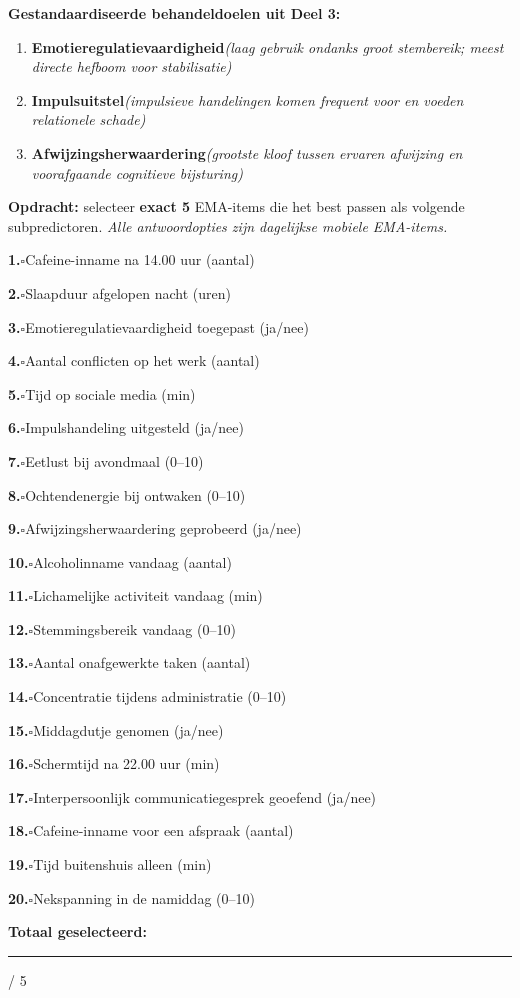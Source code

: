 \documentclass[11pt,a4paper]{article}
\newcommand{\checkitemBFS}[2]{%
\noindent\small\textbf{#1.}\hspace{0.45em}$\square$\hspace{0.4em}#2\par\vspace{0.20em}}
\begin{document}
\begin{contextbox}
\small\textbf{Gestandaardiseerde behandeldoelen uit Deel 3:}
\begin{enumerate}[topsep=2pt,itemsep=1pt,label=\arabic*.]
\item \textbf{Emotieregulatievaardigheid}\quad\textit{\small (laag gebruik ondanks groot stembereik; meest directe hefboom voor stabilisatie)}
\item \textbf{Impulsuitstel}\quad\textit{\small (impulsieve handelingen komen frequent voor en voeden relationele schade)}
\item \textbf{Afwijzingsherwaardering}\quad\textit{\small (grootste kloof tussen ervaren afwijzing en voorafgaande cognitieve bijsturing)}
\end{enumerate}
\end{contextbox}

\begin{responsebox}
\small\textbf{Opdracht:} selecteer \textbf{exact 5} EMA-items die het best passen als volgende subpredictoren.
\textit{Alle antwoordopties zijn dagelijkse mobiele EMA-items.}

\checkitemBFS{1}{Cafeine-inname na 14.00 uur (aantal)}
\checkitemBFS{2}{Slaapduur afgelopen nacht (uren)}
\checkitemBFS{3}{Emotieregulatievaardigheid toegepast (ja/nee)}
\checkitemBFS{4}{Aantal conflicten op het werk (aantal)}
\checkitemBFS{5}{Tijd op sociale media (min)}
\checkitemBFS{6}{Impulshandeling uitgesteld (ja/nee)}
\checkitemBFS{7}{Eetlust bij avondmaal (0--10)}
\checkitemBFS{8}{Ochtendenergie bij ontwaken (0--10)}
\checkitemBFS{9}{Afwijzingsherwaardering geprobeerd (ja/nee)}
\checkitemBFS{10}{Alcoholinname vandaag (aantal)}
\checkitemBFS{11}{Lichamelijke activiteit vandaag (min)}
\checkitemBFS{12}{Stemmingsbereik vandaag (0--10)}
\checkitemBFS{13}{Aantal onafgewerkte taken (aantal)}
\checkitemBFS{14}{Concentratie tijdens administratie (0--10)}
\checkitemBFS{15}{Middagdutje genomen (ja/nee)}
\checkitemBFS{16}{Schermtijd na 22.00 uur (min)}
\checkitemBFS{17}{Interpersoonlijk communicatiegesprek geoefend (ja/nee)}
\checkitemBFS{18}{Cafeine-inname voor een afspraak (aantal)}
\checkitemBFS{19}{Tijd buitenshuis alleen (min)}
\checkitemBFS{20}{Nekspanning in de namiddag (0--10)}
\vspace{0.4em}
\noindent\textbf{Totaal geselecteerd:}\hspace{0.5em}\rule{1.2cm}{0.25pt}\hspace{0.2em}/ 5
\end{responsebox}

\vspace{0.6em}
\newpage
\end{document}

